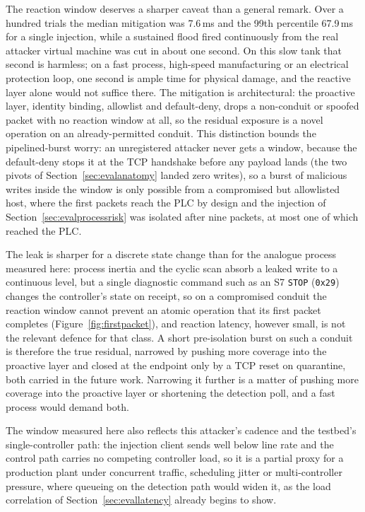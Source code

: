 The reaction window deserves a sharper caveat than a general remark. Over a hundred trials the median mitigation was 7.6\,ms and the 99th percentile 67.9\,ms for a single injection, while a sustained flood fired continuously from the real attacker virtual machine was cut in about one second. On this slow tank that second is harmless; on a fast process, high-speed manufacturing or an electrical protection loop, one second is ample time for physical damage, and the reactive layer alone would not suffice there. The mitigation is architectural: the proactive layer, identity binding, allowlist and default-deny, drops a non-conduit or spoofed packet with no reaction window at all, so the residual exposure is a novel operation on an already-permitted conduit. This distinction bounds the pipelined-burst worry: an unregistered attacker never gets a window, because the default-deny stops it at the TCP handshake before any payload lands (the two pivots of Section~\ref{sec:evalanatomy} landed zero writes), so a burst of malicious writes inside the window is only possible from a compromised but allowlisted host, where the first packets reach the PLC by design and the injection of Section~\ref{sec:evalprocessrisk} was isolated after nine packets, at most one of which reached the PLC.

The leak is sharper for a discrete state change than for the analogue process measured here: process inertia and the cyclic scan absorb a leaked write to a continuous level, but a single diagnostic command such as an S7 \texttt{STOP} (\texttt{0x29}) changes the controller's state on receipt, so on a compromised conduit the reaction window cannot prevent an atomic operation that its first packet completes (Figure~\ref{fig:firstpacket}), and reaction latency, however small, is not the relevant defence for that class. A short pre-isolation burst on such a conduit is therefore the true residual, narrowed by pushing more coverage into the proactive layer and closed at the endpoint only by a TCP reset on quarantine, both carried in the future work. Narrowing it further is a matter of pushing more coverage into the proactive layer or shortening the detection poll, and a fast process would demand both.

The window measured here also reflects this attacker's cadence and the testbed's single-controller path: the injection client sends well below line rate and the control path carries no competing controller load, so it is a partial proxy for a production plant under concurrent traffic, scheduling jitter or multi-controller pressure, where queueing on the detection path would widen it, as the load correlation of Section~\ref{sec:evallatency} already begins to show.


